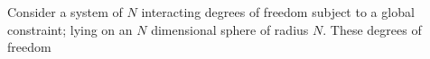 Consider a system of $N$ interacting degrees of freedom subject to a global constraint; lying on an $N$ dimensional sphere of radius $N$. These degrees of freedom 
